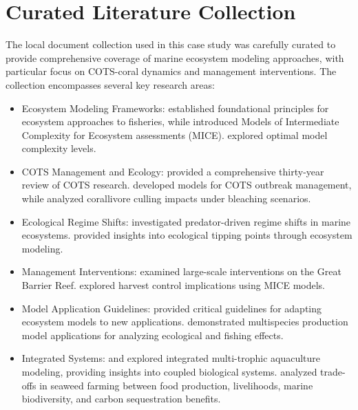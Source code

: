 \section{Curated Literature Collection}
\label{subsec:curated_literature}

The local document collection used in this case study was carefully curated to provide comprehensive coverage of marine ecosystem modeling approaches, with particular focus on COTS-coral dynamics and management interventions. The collection encompasses several key research areas:

\begin{itemize}
\item Ecosystem Modeling Frameworks: \cite{Plaganyi_2007} established foundational principles for ecosystem approaches to fisheries, while \cite{Plaganyi_Punt_Hillary_Morello_Thebaud_Hutton_Pillans_Thorson_Fulton_Smith_et_al_2014} introduced Models of Intermediate Complexity for Ecosystem assessments (MICE). \cite{Collie_Botsford_Hastings_Kaplan_Largier_Livingston_Plaganyi_Rose_Wells_Werner_2016} explored optimal model complexity levels.

\item COTS Management and Ecology: \cite{Pratchett_Caballes_Wilmes_Matthews_Mellin_Sweatman_Nadler_Brodie_Thompson_Hoey_et_al_2017} provided a comprehensive thirty-year review of COTS research. \cite{morello2014model} developed models for COTS outbreak management, while \cite{Rogers_Plaganyi_2022} analyzed corallivore culling impacts under bleaching scenarios.

\item Ecological Regime Shifts: \cite{Blamey_Plaganyi_Branch_2014} investigated predator-driven regime shifts in marine ecosystems. \cite{Plaganyi_Ellis_Blamey_Morello_Norman-Lopez_Robinson_Sporcic_Sweatman_2014} provided insights into ecological tipping points through ecosystem modeling.

\item Management Interventions: \cite{Condie_Anthony_Babcock_Baird_Beeden_Fletcher_Gorton_Harrison_Hobday_Plaganyi_et_al_2021} examined large-scale interventions on the Great Barrier Reef. \cite{Punt_MacCall_Essington_Francis_Hurtado-Ferro_Johnson_Kaplan_Koehn_Levin_Sydeman_2016} explored harvest control implications using MICE models.

\item Model Application Guidelines: \cite{Essington_Plaganyi_2014} provided critical guidelines for adapting ecosystem models to new applications. \cite{Gamble_Link_2009} demonstrated multispecies production model applications for analyzing ecological and fishing effects.

\item Integrated Systems: \cite{Hadley_Wild-Allen_Johnson_Macleod_2015} and \cite{Oca_Cremades_Jimenez_Pintado_Masalo_2019} explored integrated multi-trophic aquaculture modeling, providing insights into coupled biological systems. \cite{Spillias_Cottrell_2024} analyzed trade-offs in seaweed farming between food production, livelihoods, marine biodiversity, and carbon sequestration benefits.
\end{itemize}

